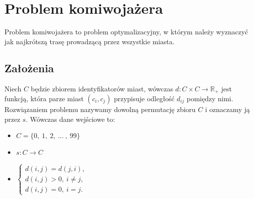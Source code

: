 \documentclass{article}
\begin{document}
\section{Problem komiwojażera}
Problem komiwojażera to problem optymalizacyjny, w którym należy wyznaczyć jak najkrótszą trasę prowadzącą przez wszystkie miasta. 
    \subsection{Założenia}
    Niech $C$ będzie zbiorem identyfikatorów miast, wówczas $d:C\times C\rightarrow\mathbb{R_+}$ jest funkcją, która parze miast $(c_i,c_j)$ przypisuje odległość $d_{ij}$ pomiędzy nimi. Rozwiązaniem problemu nazywamy dowolną permutację zbioru $C$ i oznaczamy ją przez $s$. Wówczas dane wejściowe to:
    \begin{itemize}
        \item $C=\{0,\ 1,\ 2,\ ...\ ,\ 99\}$
        \item $s:C\rightarrow C$
        \item $\left\{\begin{array}{l}
        d(i,j) = d(j,i),\\
        d(i,j) > 0,\ i\neq j, \\
        d(i,j)=0,\ i=j. 
        \end{array}\right.$
    \end{itemize}
\end{document}
